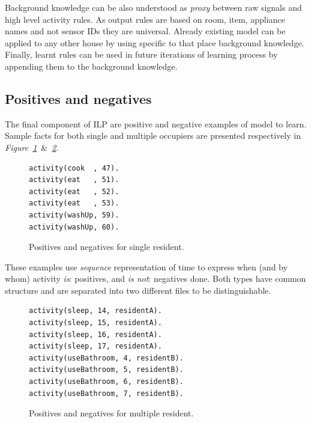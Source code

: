 \documentclass[10pt, a4paper, pdflatex, leqno, twoside, openright]{report}
\begin{document}
Background knowledge can be also understood as \emph{proxy} between raw signals and high level activity rules. As output rules are based on room, item, appliance names and not sensor IDs they are universal. Already existing model can be applied to any other house by using specific to that place background knowledge.\\
Finally, learnt rules can be used in future iterations of learning process by appending them to the background knowledge.


    \subsection{Positives and negatives\label{sec:data:posneg}}
The final component of ILP are positive and negative examples of model to learn. Sample facts for both single and multiple occupiers are presented respectively in \emph{Figure~\ref{lst:singleposneg}}~\&~\emph{\ref{lst:multiposneg}}.\\

\begin{figure}[htb] %
  \begin{verbatim}
activity(cook  , 47).
activity(eat   , 51).
activity(eat   , 52).
activity(eat   , 53).
activity(washUp, 59).
activity(washUp, 60).
  \end{verbatim}
  \caption{Positives and negatives for single resident.\label{lst:singleposneg}}
\end{figure}

These examples use \emph{sequence} representation of time to express when (and by whom) activity \emph{is}: positives, and \emph{is not}: negatives done. Both types have common structure and are separated into two different files to be distinguishable.\\

\begin{figure}[htb] %
  \begin{verbatim}
activity(sleep, 14, residentA).
activity(sleep, 15, residentA).
activity(sleep, 16, residentA).
activity(sleep, 17, residentA).
activity(useBathroom, 4, residentB).
activity(useBathroom, 5, residentB).
activity(useBathroom, 6, residentB).
activity(useBathroom, 7, residentB).
  \end{verbatim}
  \caption{Positives and negatives for multiple resident.\label{lst:multiposneg}}
\end{figure}
\end{document}
